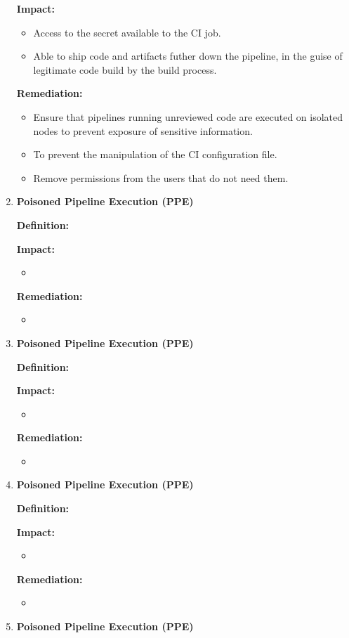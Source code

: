 \begin{enumerate}[label=(\arabic*)]
    \textbf{Impact: }
        \begin{itemize}
            \item Access to the secret available to the CI job.
            \item Able to ship code and artifacts futher down the pipeline, in the guise of legitimate 
            code build by the build process.
        \end{itemize}

    \textbf{Remediation:}
        \begin{itemize}
            \item Ensure that pipelines running unreviewed code are executed on isolated nodes to prevent
            exposure of sensitive information.
            \item To prevent the manipulation of the CI configuration file.
            \item Remove permissions from the users that do not need them.
        \end{itemize}
    \item \textbf{Poisoned Pipeline Execution (PPE)}

    \textbf{Definition: }

    \textbf{Impact: }
        \begin{itemize}
            \item
        \end{itemize}
        
    \textbf{Remediation:}
        \begin{itemize}
            \item
        \end{itemize}
    \item \textbf{Poisoned Pipeline Execution (PPE)}

    \textbf{Definition: }

    \textbf{Impact: }
        \begin{itemize}
            \item
        \end{itemize}
    \textbf{Remediation:}
        \begin{itemize}
            \item
        \end{itemize}
    \item \textbf{Poisoned Pipeline Execution (PPE)}

    \textbf{Definition: }

    \textbf{Impact: }
        \begin{itemize}
            \item
        \end{itemize}
    \textbf{Remediation:}
        \begin{itemize}
            \item
        \end{itemize}
    \item \textbf{Poisoned Pipeline Execution (PPE)}


\end{enumerate}
